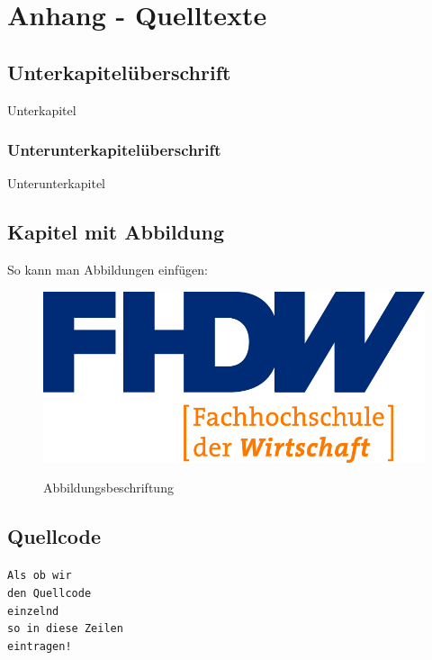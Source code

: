 \section{Anhang - Quelltexte}
\label{instal}

\subsection{Unterkapitelüberschrift}

Unterkapitel

\subsubsection{Unterunterkapitelüberschrift}

Unterunterkapitel

\subsection{Kapitel mit Abbildung}

So kann man Abbildungen einfügen:

\begin{figure}[hbt]
\centering
\begin{minipage}[t]{1\textwidth} %
\caption{Abbildungsbeschriftung} %
\includegraphics[width=1\textwidth]{img/fhdw}\\ %
\end{minipage}
\end{figure}

\subsection{Quellcode}

\texttt{Als ob wir}\\
\texttt{den Quellcode}\\
\texttt{einzelnd}\\
\texttt{so in diese Zeilen}\\
\texttt{eintragen!}\\

